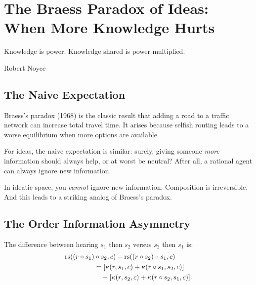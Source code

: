 
\chapter{The Braess Paradox of Ideas: When More Knowledge Hurts}

\epigraph{Knowledge is power. Knowledge shared is power multiplied.}{Robert Noyce}

\section{The Naive Expectation}

Braess's paradox (1968) is the classic result that adding a road to a traffic network can increase total travel time. It arises because selfish routing leads to a worse equilibrium when more options are available.

For ideas, the naive expectation is similar: surely, giving someone \emph{more} information should always help, or at worst be neutral? After all, a rational agent can always ignore new information.

In ideatic space, you \emph{cannot} ignore new information. Composition is irreversible. And this leads to a striking analog of Braess's paradox.

\section{The Order Information Asymmetry}

\begin{theorem}
\label{thm:framing-effect}
The difference between hearing $s_1$ then $s_2$ versus $s_2$ then $s_1$ is:
\begin{align*}
\operatorname{rs}((r \circ s_1) &\circ s_2, c) - \operatorname{rs}((r \circ s_2) \circ s_1, c) \\
&= [\kappa(r, s_1, c) + \kappa(r \circ s_1, s_2, c)] \\
&\quad - [\kappa(r, s_2, c) + \kappa(r \circ s_2, s_1, c)].
\end{align*}
\end{theorem}

